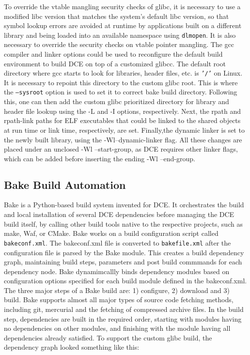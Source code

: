 \documentclass{sig-alternate}
\begin{document}
To override the vtable mangling security checks of glibc, it is necessary to use a modified libc version that matches the system's default libc version,
so that symbol lookup errors are avoided at runtime by applications built on a different library and being loaded into an available namespace using \texttt{dlmopen}.
It is also necessary to override the security checks on vtable pointer mangling. The gcc compiler and linker options could be used to 
reconfigure the default build environment to build DCE on top of a customized
glibcc. The default root directory where gcc starts to look for
libraries, header files, etc. is  \texttt{'/'} on Linux.  It is necessary to repoint this directory to the custom glibc root. This is where the \texttt{--sysroot} option 
is used to set it to correct bake build directory. Following this, one can then add the custom glibc prioritized directory for library and header file lookup using the 
-L and -I options, respectively. Next, the rpath and rpath-link paths for ELF executables that could be linked to the shared objects at run time 
or link time, respectively, are set. Finally,the dynamic linker is set to the newly built library, using the -Wl--dynamic-linker flag.  All these changes
are placed under an unclosed -Wl --start-group, as DCE requires other linker flags, which can be added before inserting the ending -Wl --end-group.
 


\subsection{Bake Build Automation}

Bake is a Python-based build system invented for DCE.  It orchestrates the build and local installation of several DCE dependencies before managing the DCE build itself, by calling other build tools native to the respective projects, such as make, Waf, or CMake.  Bake works on a build configuration script called \texttt{bakeconf.xml}. The bakeconf.xml file is converted to \texttt{bakefile.xml} after the configuration file is 
parsed by the Bake module. This creates a build dependency graph, maintaining build steps, parameters and post build 
commmands for each dependency node. Bake dynamimcallly binds dependency modules based on configuration options specified for each build module 
defined in the bakeconf.xml. The three major steps of a Bake build are:
1) configure, 2) download and 3) build. Bake supports almost all major types of 
source code fetching methods, including git, mercurial and the fetching of compressed archive files. In the build step, dependencies 
are built in the required order, starting with modules having no dependencies on other modules, and finishing with the module having all dependencies already satisfied. To support 
the custom glibc build, the dependency graph looked something like this: 
\end{document}
